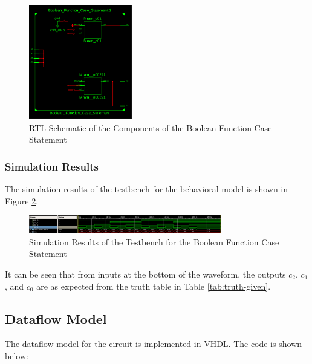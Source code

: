\documentclass[table]{article}
\begin{document}
\begin{figure}[H]
    \centering
    \includegraphics[width=0.4\textwidth]{img/RTLLAYER.png}
    \caption{RTL Schematic of the Components of the Boolean Function Case Statement}
    \label{fig:rtl-schematic-components}

\end{figure}


\subsubsection*{Simulation Results}

The simulation results of the testbench for the behavioral model is shown in Figure \ref{fig:simulation-results}.

\begin{figure}[H]
    \centering
    \includegraphics[width=0.75\textwidth]{img/anakod3.png}
    \caption{Simulation Results of the Testbench for the Boolean Function Case Statement}
    \label{fig:simulation-results}
\end{figure}

It can be seen that from inputs at the bottom of the waveform, the outputs \(c_2\), \(c_1\), and \(c_0\) are as expected from the truth table in Table \ref{tab:truth-given}.

\newpage

\subsection*{Dataflow Model}

The dataflow model for the circuit is implemented in VHDL. The code is shown below:

\begin{center} %
    \lstset{
  caption= Boolean\_Function\_Data\_Flow.vhd, 
  basicstyle=\footnotesize, frame=tb,
  xleftmargin=.2\textwidth, xrightmargin=.2\textwidth
}
    

\end{center}
\end{document}

